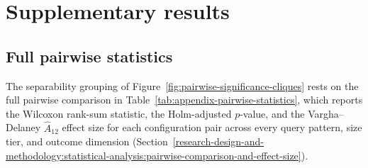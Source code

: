 \newif\ifapxfirstsub \apxfirstsubtrue
\let\apxorigsubsection\subsection
\renewcommand{\subsection}{\ifapxfirstsub\apxfirstsubfalse\else\clearpage\fi\apxorigsubsection}

\section{Supplementary results}
\label{appendix:supplementary-results}

\subsection{Full pairwise statistics}

The separability grouping of Figure~\ref{fig:pairwise-significance-cliques} rests on the full pairwise comparison in Table~\ref{tab:appendix-pairwise-statistics}, which reports the Wilcoxon rank-sum statistic, the Holm-adjusted $p$-value, and the Vargha--Delaney $\hat{A}_{12}$ effect size for each configuration pair across every query pattern, size tier, and outcome dimension (Section~\ref{research-design-and-methodology:statistical-analysis:pairwise-comparison-and-effect-size}).

